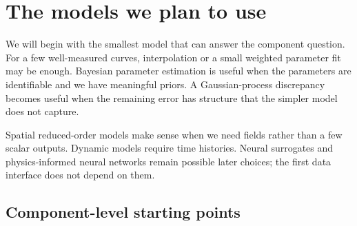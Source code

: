 \section{The models we plan to use}

We will begin with the smallest model that can answer the component question. For a few well-measured curves, interpolation or a small weighted parameter fit may be enough. Bayesian parameter estimation is useful when the parameters are identifiable and we have meaningful priors. A Gaussian-process discrepancy becomes useful when the remaining error has structure that the simpler model does not capture.

Spatial reduced-order models make sense when we need fields rather than a few scalar outputs. Dynamic models require time histories. Neural surrogates and physics-informed neural networks remain possible later choices; the first data interface does not depend on them.

\subsection{Component-level starting points}

